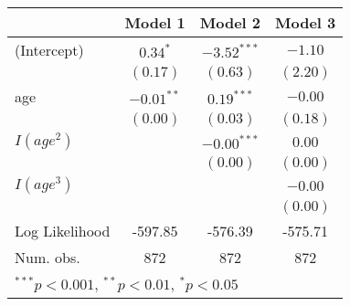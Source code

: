 
\begin{table}[hb!]
\footnotesize
\begin{center}
\begin{tabular}{l c c c }
\toprule
 & Model 1 & Model 2 & Model 3 \\
\midrule
(Intercept)    & $0.34^{*}$   & $-3.52^{***}$ & $-1.10$  \\
               & $(0.17)$     & $(0.63)$      & $(2.20)$ \\
age            & $-0.01^{**}$ & $0.19^{***}$  & $-0.00$  \\
               & $(0.00)$     & $(0.03)$      & $(0.18)$ \\
$I(age^2)$       &              & $-0.00^{***}$ & $0.00$   \\
               &              & $(0.00)$      & $(0.00)$ \\
$I(age^3)$       &              &               & $-0.00$  \\
               &              &               & $(0.00)$ \\
\midrule
Log Likelihood & -597.85      & -576.39       & -575.71  \\
Num. obs.      & 872          & 872           & 872      \\
\bottomrule
\multicolumn{4}{l}{\scriptsize{$^{***}p<0.001$, $^{**}p<0.01$, $^*p<0.05$}}
\end{tabular}
\label{table:coefficients}
\end{center}
\end{table}
